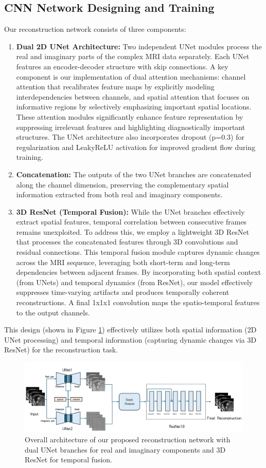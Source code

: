\documentclass{article}
\begin{document}
\subsection{CNN Network Designing and Training}
Our reconstruction network consists of three components:
\begin{enumerate}
   \item \textbf{Dual 2D UNet Architecture:} Two independent UNet modules process the real and imaginary parts of the complex MRI data separately. Each UNet features an encoder-decoder structure with skip connections. A key component is our implementation of dual attention mechanisms: channel attention that recalibrates feature maps by explicitly modeling interdependencies between channels, and spatial attention that focuses on informative regions by selectively emphasizing important spatial locations. These attention modules significantly enhance feature representation by suppressing irrelevant features and highlighting diagnostically important structures. The UNet architecture also incorporates dropout (p=0.3) for regularization and LeakyReLU activation for improved gradient flow during training.
    \item \textbf{Concatenation:} The outputs of the two UNet branches are concatenated along the channel dimension, preserving the complementary spatial information extracted from both real and imaginary components.
    \item \textbf{3D ResNet (Temporal Fusion):} While the UNet branches effectively extract spatial features, temporal correlation between consecutive frames remains unexploited. To address this, we employ a lightweight 3D ResNet that processes the concatenated features through 3D convolutions and residual connections. This temporal fusion module captures dynamic changes across the MRI sequence, leveraging both short-term and long-term dependencies between adjacent frames. By incorporating both spatial context (from UNets) and temporal dynamics (from ResNet), our model effectively suppresses time-varying artifacts and produces temporally coherent reconstructions. A final 1x1x1 convolution maps the spatio-temporal features to the output channels.
\end{enumerate}
This design (shown in Figure \ref{fig:pipeline}) effectively utilizes both spatial information (2D UNet processing) and temporal information (capturing dynamic changes via 3D ResNet) for the reconstruction task.
\begin{figure}[H]
  \centering
  \includegraphics[width=0.85\linewidth]{../assets/pipeline.png}
  \caption{Overall architecture of our proposed reconstruction network with dual UNet branches for real and imaginary components and 3D ResNet for temporal fusion.}
  \label{fig:pipeline}
\end{figure}
\end{document}
